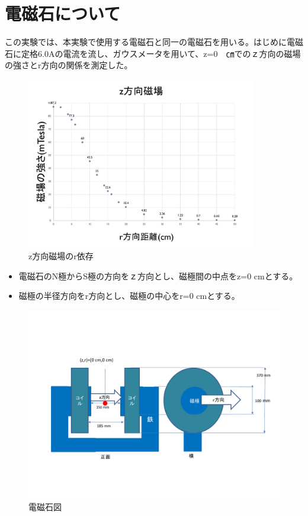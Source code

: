 \section{電磁石について}
この実験では、本実験で使用する電磁石と同一の電磁石を用いる。はじめに電磁石に定格6.0Aの電流を流し、ガウスメータを用いて、z=0　㎝でのｚ方向の磁場の強さとr方向の関係を測定した。
\begin{figure}[H]
	\centering
		\includegraphics[width=10cm]{fig/iguchi/maggraph1.pdf}
	\caption{z方向磁場のr依存}
	\label{maggraph1}
\end{figure}

\begin{itemize}
       \item 電磁石のN極からS極の方向をｚ方向とし、磁極間の中点をz=0 cmとする。
       \item 磁極の半径方向をr方向とし、磁極の中心をr=0 cmとする。
\end{itemize}
\begin{figure}[H]
	\centering
		\includegraphics[width=15cm]{fig/iguchi/magnetfigure.pdf}
	\caption{電磁石図}
	\label{magnetfigure}
\end{figure}

